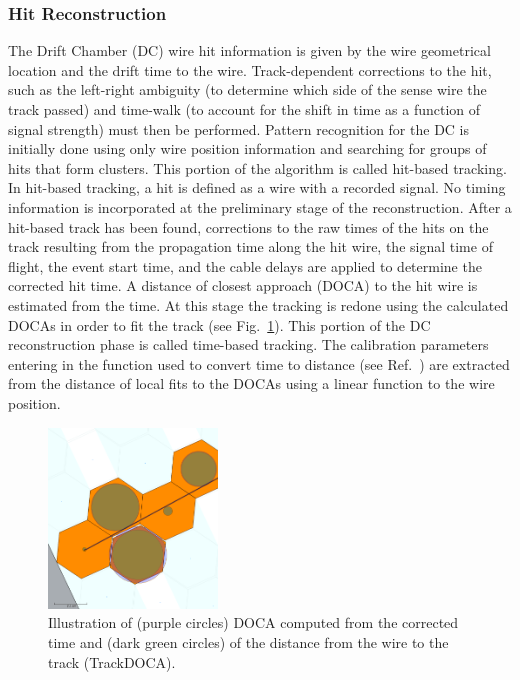 \subsubsection{Hit Reconstruction}
\label{sec:hitrecon}

The Drift Chamber (DC) wire hit information is given by the wire geometrical location and the drift time to the
wire. Track-dependent corrections to the hit, such as the left-right ambiguity (to determine which side of the
sense wire the track passed) and time-walk (to account for the shift in time as a function of signal strength)
must then be performed. Pattern recognition for the DC is initially done using only wire position information and
searching for groups of hits that form clusters. This portion of the algorithm is called hit-based tracking.  In
hit-based tracking, a hit is defined as a wire with a recorded signal. No timing information is incorporated at the
preliminary stage of the reconstruction. After a hit-based track has been found, corrections to the raw times of
the hits on the track resulting from the propagation time along the hit wire, the signal time of flight, the event start
time, and the cable delays are applied to determine the corrected hit time. A distance of closest approach (DOCA)
to the hit wire is estimated from the time. At this stage the tracking is redone using the calculated DOCAs in order
to fit the track (see Fig.~\ref{fig:docas}). This portion of the DC reconstruction phase is called time-based tracking.
The calibration parameters entering in the function used to convert time to distance (see Ref.~\cite{dc-nim}) are
extracted from the distance of local fits to the DOCAs using a linear function to the wire position. 

\begin{figure}
\centering
\includegraphics[width=0.4\textwidth]{pics/dcPattern10.png}
\caption{Illustration of (purple circles) DOCA computed from the corrected time and (dark green circles) of the distance from the wire to the track
  (TrackDOCA).}
\label{fig:docas}
\end{figure}

